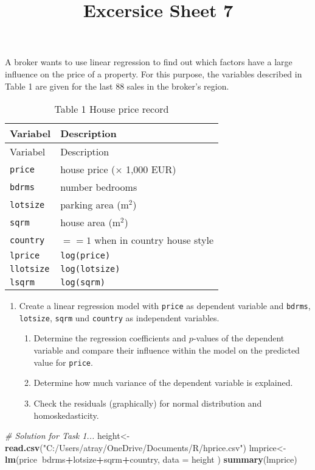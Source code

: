 \documentclass[11pt,]{article}
\title{Excersice Sheet 7}
\author{}
\date{}
\newenvironment{Shaded}{\begin{snugshade}}{\end{snugshade}}
\newcommand{\CommentTok}[1]{\textcolor[rgb]{0.56,0.35,0.01}{\textit{#1}}}
\newcommand{\DataTypeTok}[1]{\textcolor[rgb]{0.13,0.29,0.53}{#1}}
\newcommand{\KeywordTok}[1]{\textcolor[rgb]{0.13,0.29,0.53}{\textbf{#1}}}
\newcommand{\NormalTok}[1]{#1}
\newcommand{\OperatorTok}[1]{\textcolor[rgb]{0.81,0.36,0.00}{\textbf{#1}}}
\newcommand{\StringTok}[1]{\textcolor[rgb]{0.31,0.60,0.02}{#1}}
\providecommand{\tightlist}{%
  \setlength{\itemsep}{0pt}\setlength{\parskip}{0pt}}
\begin{document}
\maketitle

\captionsetup[table]{labelformat=empty}

A broker wants to use linear regression to find out which factors have a
large influence on the price of a property. For this purpose, the
variables described in Table 1 are given for the last 88 sales in the
broker's region.

\begin{longtable}[]{@{}ll@{}}
\caption{Table 1 House price record}\tabularnewline
\toprule
Variabel & Description\tabularnewline
\midrule
\endfirsthead
\toprule
Variabel & Description\tabularnewline
\midrule
\endhead
\texttt{price} & house price (\(\times\) 1,000 EUR)\tabularnewline
\texttt{bdrms} & number bedrooms\tabularnewline
\texttt{lotsize} & parking area (m\(^2\))\tabularnewline
\texttt{sqrm} & house area (m\(^2\))\tabularnewline
\texttt{country} & \(==1\) when in country house style\tabularnewline
\texttt{lprice} & \texttt{log(price)}\tabularnewline
\texttt{llotsize} & \texttt{log(lotsize)}\tabularnewline
\texttt{lsqrm} & \texttt{log(sqrm)}\tabularnewline
\bottomrule
\end{longtable}

\begin{enumerate}
\def\labelenumi{\arabic{enumi}.}
\tightlist
\item
  Create a linear regression model with \texttt{price} as dependent
  variable and \texttt{bdrms}, \texttt{lotsize}, \texttt{sqrm} und
  \texttt{country} as independent variables.

  \begin{enumerate}
  \def\labelenumii{\alph{enumii})}
  \tightlist
  \item
    Determine the regression coefficients and \(p\)-values of the
    dependent variable and compare their influence within the model on
    the predicted value for \texttt{price}.
  \item
    Determine how much variance of the dependent variable is explained.
  \item
    Check the residuals (graphically) for normal distribution and
    homoskedasticity.
  \end{enumerate}
\end{enumerate}

\begin{Shaded}
\begin{Highlighting}[]
\CommentTok{# Solution for Task 1...}
\NormalTok{height<-}\KeywordTok{read.csv}\NormalTok{(}\StringTok{"C:/Users/atray/OneDrive/Documents/R/hprice.csv"}\NormalTok{)}
\NormalTok{lmprice<-}\StringTok{ }\KeywordTok{lm}\NormalTok{(price}\OperatorTok{~}\NormalTok{bdrms}\OperatorTok{+}\NormalTok{lotsize}\OperatorTok{+}\NormalTok{sqrm}\OperatorTok{+}\NormalTok{country, }\DataTypeTok{data =}\NormalTok{ height )}
\KeywordTok{summary}\NormalTok{(lmprice)}
\end{Highlighting}
\end{Shaded}
\end{document}
